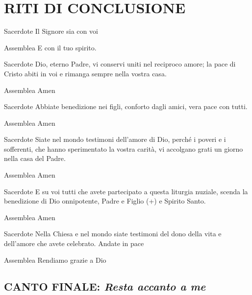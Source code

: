 
\section*{RITI DI CONCLUSIONE}

\begin{dialoghi}
\item[Sacerdote] Il Signore sia con voi
\item[Assemblea] E con il tuo spirito.
\item[Sacerdote] Dio, eterno Padre, vi conservi uniti nel reciproco amore; la pace di Cristo abiti in voi e rimanga sempre nella vostra casa.
\item[Assemblea] Amen
\item[Sacerdote] Abbiate benedizione nei figli, conforto dagli amici, vera pace con tutti.
\item[Assemblea] Amen
\item[Sacerdote] Siate nel mondo testimoni dell'amore di Dio, perché i poveri e i sofferenti, che hanno sperimentato la vostra carità, vi accolgano grati un giorno nella casa del Padre.
\item[Assemblea] Amen
\item[Sacerdote] E su voi tutti che avete partecipato a questa liturgia nuziale, scenda la benedizione di Dio onnipotente, Padre e Figlio (+) e Spirito Santo.
\item[Assemblea] Amen
\item[Sacerdote] Nella Chiesa e nel mondo siate testimoni del dono della vita e dell'amore che avete celebrato. Andate in pace
\item[Assemblea] Rendiamo grazie a Dio
\end{dialoghi}

\subsection*{CANTO FINALE: \textit{Resta accanto a me}}


